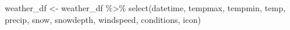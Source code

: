 \documentclass[
  letterpaper,
  DIV=11,
  numbers=noendperiod]{scrartcl}
\newenvironment{Shaded}{\begin{snugshade}}{\end{snugshade}}
\newcommand{\FunctionTok}[1]{\textcolor[rgb]{0.28,0.35,0.67}{#1}}
\newcommand{\NormalTok}[1]{\textcolor[rgb]{0.00,0.23,0.31}{#1}}
\newcommand{\OtherTok}[1]{\textcolor[rgb]{0.00,0.23,0.31}{#1}}
\newcommand{\SpecialCharTok}[1]{\textcolor[rgb]{0.37,0.37,0.37}{#1}}
\newcommand{\StringTok}[1]{\textcolor[rgb]{0.13,0.47,0.30}{#1}}
\begin{document}
\begin{Shaded}
\begin{Highlighting}[]
\NormalTok{weather\_df }\OtherTok{\textless{}{-}}
\NormalTok{  weather\_df }\SpecialCharTok{\%\textgreater{}\%}
  \FunctionTok{select}\NormalTok{(}\StringTok{\textquotesingle{}datetime\textquotesingle{}}\NormalTok{, }\StringTok{\textquotesingle{}tempmax\textquotesingle{}}\NormalTok{, }\StringTok{\textquotesingle{}tempmin\textquotesingle{}}\NormalTok{, }\StringTok{\textquotesingle{}temp\textquotesingle{}}\NormalTok{, }\StringTok{\textquotesingle{}precip\textquotesingle{}}\NormalTok{, }\StringTok{\textquotesingle{}snow\textquotesingle{}}\NormalTok{, }
         \StringTok{\textquotesingle{}snowdepth\textquotesingle{}}\NormalTok{, }\StringTok{\textquotesingle{}windspeed\textquotesingle{}}\NormalTok{, }\StringTok{\textquotesingle{}conditions\textquotesingle{}}\NormalTok{, }\StringTok{\textquotesingle{}icon\textquotesingle{}}\NormalTok{)}
\end{Highlighting}
\end{Shaded}
\end{document}
